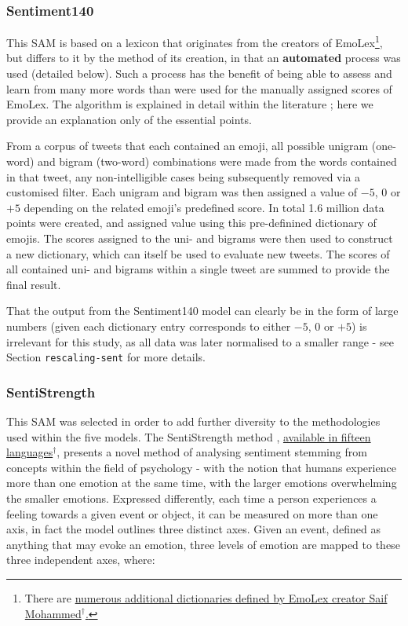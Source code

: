 \documentclass{article}
\begin{document}
\subsubsection{Sentiment140}
\label{sec-1-4-2}

This SAM is based on a lexicon that originates from the creators of EmoLex\footnote{There are \href{http://saifmohammad.com/WebPages/lexicons.html}{numerous additional dictionaries defined by EmoLex creator Saif Mohammed$^{\dag{}}$.}}, but differs to it by the method of its creation, in that an \textbf{automated} process was used (detailed below). Such a process has the benefit of being able to assess and learn from many more words than were used for the manually assigned scores of EmoLex. The algorithm is explained in detail within the literature \cite{MohammadKZ2013}; here we provide an explanation only of the essential points.

From a corpus of tweets that each contained an emoji, all possible unigram (one-word) and bigram (two-word) combinations were made from the words contained in that tweet, any non-intelligible cases being subsequently removed via a customised filter. Each unigram and bigram was then assigned a value of $-5$, $0$ or $+5$ depending on the related emoji's predefined score. In total 1.6 million data points were created, and assigned value using this pre-definined dictionary of emojis. The scores assigned to the uni- and bigrams were then used to construct a new dictionary, which can itself be used to evaluate new tweets. The scores of all contained uni- and bigrams within a single tweet are summed to provide the final result.

That the output from the Sentiment140 model can clearly be in the form of large numbers (given each dictionary entry corresponds to either $-5$, $0$ or $+5$) is irrelevant for this study, as all data was later normalised to a smaller range - see Section \texttt{rescaling-sent} for more details.


\subsubsection{SentiStrength}
\label{sec-1-4-3}

This SAM was selected in order to add further diversity to the methodologies used within the five models. The SentiStrength method \cite{Thelwall:2010:SSS:1890706.1890713}, \href{http://sentistrength.wlv.ac.uk/}{available in fifteen languages$^{\dag{}}$}, presents a novel method of analysing sentiment stemming from concepts within the field of psychology - with the notion that humans experience more than one emotion at the same time, with the larger emotions overwhelming the smaller emotions. Expressed differently, each time a person experiences a feeling towards a given event or object, it can be measured on more than one axis, in fact the model outlines three distinct axes. Given an event, defined as anything that may evoke an emotion, three levels of emotion are mapped to these three independent axes, where:
\end{document}

